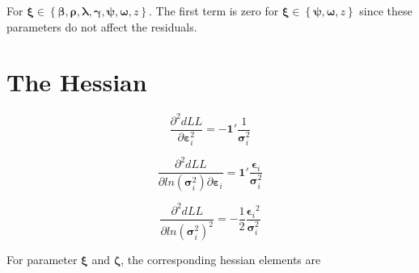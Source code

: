 \documentclass[12pt]{article}
\begin{document}
For
$\mathbf{\xi} \in \left\{ \mathbf{\beta}\mathbf{,}\mathbf{\rho}\mathbf{,}\mathbf{\lambda}\mathbf{,}\mathbf{\gamma}\mathbf{,}\mathbf{\psi}\mathbf{,}\mathbf{\omega}\mathbf{,}z \right\}$.
The first term is zero for
$\mathbf{\xi} \in \left\{ \mathbf{\psi,\omega,}z \right\}$ since
these parameters do not affect the residuals.



\section{The Hessian}\label{the-hessian}



\begin{equation}
\frac{\partial^{2}dLL}{\partial\mathbf{\varepsilon}_{i}^{2}}=
- \mathbf{1}'\frac{1}{\mathbf{\sigma}_{i}^{2}}
\label{eq:H1}
\end{equation}


\begin{equation}
\frac{\partial^{2}dLL}{{\partial ln}\left( \mathbf{\sigma}_{i}^{2} \right)\partial\mathbf{\varepsilon}_{i}} = \mathbf{1}'\frac{\mathbf{\epsilon}_{i}}{\mathbf{\sigma}_{i}^{2}}
\label{eq:H2}
\end{equation}


\begin{equation}\frac{\partial^{2}dLL}{{\partial ln}\left( \mathbf{\sigma}_{i}^{2} \right)^{2}} = - \frac{1}{2}\frac{{\mathbf{\epsilon}_{i}}^{2}}{\mathbf{\sigma}_{i}^{2}}
\label{eq:H3}
\end{equation}




For parameter $\mathbf{\xi}$ and $\mathbf{\zeta}$, the corresponding hessian elements are
\end{document}
